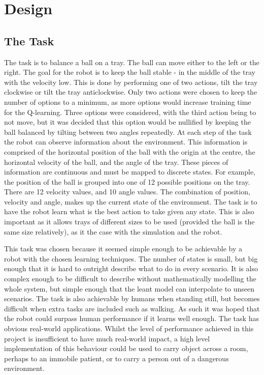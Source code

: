 \documentclass[12pt,a4paper]{article}
\begin{document}
\section{Design}

\subsection{The Task}
The task is to balance a ball on a tray. The ball can move either to the left or the right. The goal for the robot is to keep the ball stable - in the middle of the tray with the velocity low. This is done by performing one of two actions, tilt the tray clockwise or tilt the tray anticlockwise. Only two actions were chosen to keep the number of options to a minimum, as more options would increase training time for the Q-learning. Three options were considered, with the third action being to not move, but it was decided that this option would be nullified by keeping the ball balanced by tilting between two angles repeatedly. At each step of the task the robot can observe information about the environment. This information is comprised of the horizontal position of the ball with the origin at the centre, the horizontal velocity of the ball, and the angle of the tray. These pieces of information are continuous and must be mapped to discrete states. For example, the position of the ball is grouped into one of 12 possible positions on the tray. There are 12 velocity values, and 10 angle values. The combination of position, velocity and angle, makes up the current state of the environment. The task is to have the robot learn what is the best action to take given any state. This is also important as it allows trays of different sizes to be used (provided the ball is the same size relatively), as it the case with the simulation and the robot. 

This task was chosen because it seemed simple enough to be achievable by a robot with the chosen learning techniques. The number of states is small, but big enough that it is hard to outright describe what to do in every scenario. It is also complex enough to be difficult to describe without mathematically modelling the whole system, but simple enough that the leant model can interpolate to unseen scenarios. The task is also achievable by humans when standing still, but becomes difficult when extra tasks are included such as walking. As such it was hoped that the robot could surpass human performance if it learns well enough. The task has obvious real-world applications. Whilst the level of performance achieved in this project is insufficient to have much real-world impact, a high level implementation of this behaviour could be used to carry object across a room, perhaps to an immobile patient, or to carry a person out of a dangerous environment.
\end{document}
